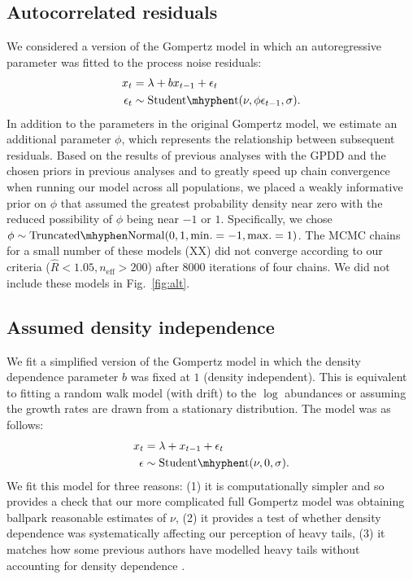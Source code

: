 \subsection{Autocorrelated residuals}

We considered a version of the Gompertz model in which an autoregressive
parameter was fitted to the process noise residuals:
\begin{align*}
x_t &= \lambda + b x_{t-1} + \epsilon_t\\
\epsilon_t &\sim \mathrm{Student\mhyphen t}(\nu, \phi \epsilon_{t-1}, \sigma).
\end{align*}
In addition to the parameters in the original Gompertz model, we estimate an
additional parameter $\phi$, which represents the relationship between
subsequent residuals. Based on the results of previous analyses with the GPDD
\citep[e.g.][]{connors2014} and the chosen priors in previous analyses
\citep[e.g.][]{thorson2014a} and to greatly speed up chain convergence when
running our model across all populations, we placed a weakly informative prior
on $\phi$ that assumed the greatest probability density near zero with the
reduced possibility of $\phi$ being near $-1$ or $1$. Specifically, we chose
$\phi \sim \mathrm{Truncated\mhyphen Normal}(0, 1, \mathrm{min.} = -1,
\mathrm{max.} = 1)$. The MCMC chains for a small number of these models (XX) did
not converge according to our criteria ($\widehat{R} < 1.05, n_\mathrm{eff}
> 200$) after 8000 iterations of four chains. We did not include these models in
Fig.~\ref{fig:alt}.

\subsection{Assumed density independence}\label{assumed-density-independence}

We fit a simplified version of the Gompertz model in which the density
dependence parameter $b$ was fixed at $1$ (density independent). This is
equivalent to fitting a random walk model (with drift) to the $\log$ abundances
or assuming the growth rates are drawn from a stationary distribution. The
model was as follows:
\begin{align*}
x_t &= \lambda + x_{t-1} + \epsilon_t\\
\epsilon &\sim \mathrm{Student\mhyphen t}(\nu, 0, \sigma).
\end{align*}
We fit this model for three reasons: (1) it is computationally simpler and so
provides a check that our more complicated full Gompertz model was obtaining
ballpark reasonable estimates of $\nu$, (2) it provides a test of whether
density dependence was systematically affecting our perception of heavy tails,
(3) it matches how some previous authors have modelled heavy tails without
accounting for density dependence \citep{segura2013}.

